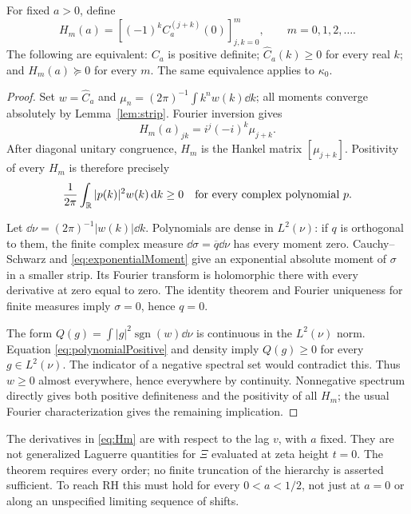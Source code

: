 \begin{theorem}\label{thm:hierarchy}
For fixed $a>0$, define
\begin{equation}\label{eq:Hm}
H_m(a)=\left[(-1)^k C_a^{(j+k)}(0)\right]_{j,k=0}^m,
\qquad m=0,1,2,\ldots.
\end{equation}
The following are equivalent: $C_a$ is positive definite; $\widehat C_a(k)\ge0$ for every real $k$; and $H_m(a)\succeq0$ for every $m$. The same equivalence applies to $\kappa_0$.
\end{theorem}
\begin{proof}
Set $w=\widehat C_a$ and $\mu_n=(2\pi)^{-1}\int k^n w(k)\dd k$; all moments converge absolutely by Lemma~\ref{lem:strip}. Fourier inversion gives
\[
H_m(a)_{jk}=i^j(-i)^k\mu_{j+k}.
\]
After diagonal unitary congruence, $H_m$ is the Hankel matrix $[\mu_{j+k}]$. Positivity of every $H_m$ is therefore precisely
\begin{equation}\label{eq:polynomialPositive}
\frac1{2\pi}\int_{\mathbb R}|p(k)|^2w(k)\,\mathrm d k\ge0
\quad\text{for every complex polynomial }p.
\end{equation}

Let $\dd\nu=(2\pi)^{-1}|w(k)|\dd k$. Polynomials are dense in $L^2(\nu)$: if $q$ is orthogonal to them, the finite complex measure $\dd\sigma=\overline q\dd\nu$ has every moment zero. Cauchy--Schwarz and \eqref{eq:exponentialMoment} give an exponential absolute moment of $\sigma$ in a smaller strip. Its Fourier transform is holomorphic there with every derivative at zero equal to zero. The identity theorem and Fourier uniqueness for finite measures imply $\sigma=0$, hence $q=0$.

The form $Q(g)=\int|g|^2\operatorname{sgn}(w)\dd\nu$ is continuous in the $L^2(\nu)$ norm. Equation \eqref{eq:polynomialPositive} and density imply $Q(g)\ge0$ for every $g\in L^2(\nu)$. The indicator of a negative spectral set would contradict this. Thus $w\ge0$ almost everywhere, hence everywhere by continuity. Nonnegative spectrum directly gives both positive definiteness and the positivity of all $H_m$; the usual Fourier characterization gives the remaining implication.
\end{proof}

The derivatives in \eqref{eq:Hm} are with respect to the lag $v$, with $a$ fixed. They are not generalized Laguerre quantities for $\Xi$ evaluated at zeta height $t=0$. The theorem requires every order; no finite truncation of the hierarchy is asserted sufficient. To reach RH this must hold for every $0<a<1/2$, not just at $a=0$ or along an unspecified limiting sequence of shifts.

